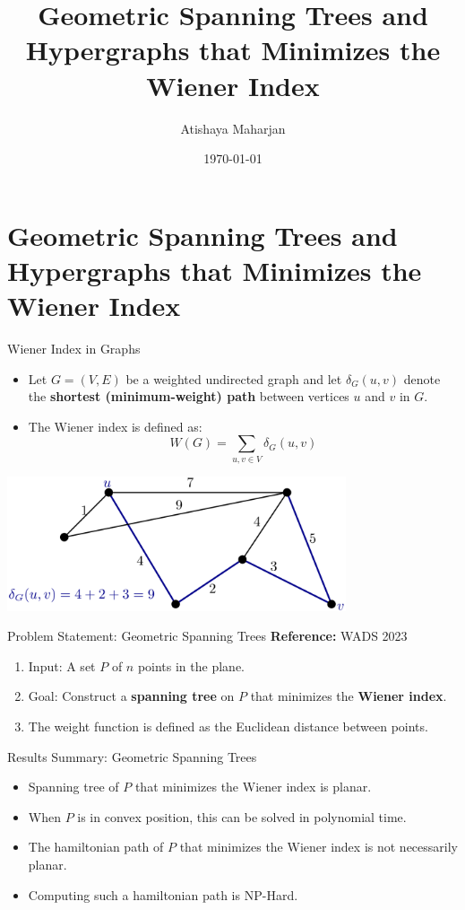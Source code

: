 \documentclass[11pt]{beamer}
\author[Atishaya Maharjan]{Atishaya Maharjan}
\title{Geometric Spanning Trees and Hypergraphs that Minimizes the Wiener Index}
\institute[]{University of Manitoba\par Geometric, Approximation, and Distributed Algorithms (GADA) lab}
\date{\today}
\begin{document}
\begin{frame}
	\titlepage
\end{frame}

\section{Geometric Spanning Trees and Hypergraphs that Minimizes the Wiener Index}

\begin{frame}{Wiener Index in Graphs}
	\begin{itemize}
		\item Let $G = (V, E)$ be a weighted undirected graph and let $\delta_G(u, v)$ denote the \textbf{shortest (minimum-weight) path}  between vertices $u$ and $v$ in $G$.
		      \pause
		\item The Wiener index is defined as:
		      \[
			      W(G) = \sum_{u, v \in V} \delta_G(u, v)
		      \]
		      \pause
	\end{itemize}
	\begin{center}
		\includegraphics[width=0.75\textwidth]{images/wiener_index.png} %
	\end{center}
\end{frame}

\begin{frame}{Problem Statement: Geometric Spanning Trees}
	\textbf{Reference:} WADS 2023 ~\cite{article:geometric_spanning_trees_minimizing_wiener_index}

	\begin{enumerate}
		\item Input: A set $P$ of $n$ points in the plane.
		      \pause
		\item Goal: Construct a \textbf{spanning tree} on $P$ that minimizes the \textbf{Wiener index}.
		      \pause
		\item The weight function is defined as the Euclidean distance between points.
	\end{enumerate}
\end{frame}

\begin{frame}{Results Summary: Geometric Spanning Trees}
	\begin{itemize}
		\item Spanning tree of $P$ that minimizes the Wiener index is planar.
		      \pause
		\item When $P$ is in convex position, this can be solved in polynomial time.
		      \pause
		\item The hamiltonian path of $P$ that minimizes the Wiener index is not necessarily planar.
		      \pause
		\item Computing such a hamiltonian path is NP-Hard.
	\end{itemize}
\end{frame}
\end{document}
